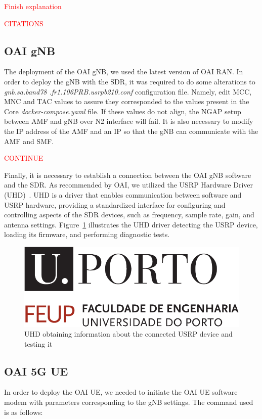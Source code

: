 \textcolor{red}{Finish explanation}

\textcolor{red}{CITATIONS}
\subsection{OAI gNB}\label{subsec:oai-gnb}
The deployment of the OAI gNB, we used the latest version of OAI RAN. In order to deploy the gNB with the SDR, it was required to do some alterations to \textit{gnb.sa.band78
.fr1.106PRB.usrpb210.conf} configuration file.
Namely, edit MCC, MNC and TAC values to assure they corresponded to the values present in the Core \textit{docker-compose.yaml} file.
If these values do not align, the NGAP setup between AMF and gNB over N2 interface will fail.
It is also necessary to modify the IP address of the AMF and an IP so that the gNB can communicate with the AMF and SMF\@.

\textcolor{red}{CONTINUE}

Finally, it is necessary to establish a connection between the OAI gNB software and the SDR\@.
As recommended by OAI, we utilized the USRP Hardware Driver (UHD)~\cite{}.
UHD is a driver that enables communication between software and USRP hardware, providing a standardized interface for configuring and controlling aspects of the SDR devices, such as frequency, sample rate, gain, and antenna settings.
Figure~\ref{fig:uhd_probe} illustrates the UHD driver detecting the USRP device, loading its firmware, and performing diagnostic tests.

\begin{figure}[H]
    \centering
    \includegraphics[width=0.7\linewidth]{figures/uporto-feup}
    \caption{UHD obtaining information about the connected USRP device and testing it}
    \label{fig:uhd_probe}
\end{figure}

\subsection{OAI 5G UE}\label{subsec:oai-5g-ue}
In order to deploy the OAI UE, we needed to initiate the OAI UE software modem with parameters corresponding to the gNB settings.
The command used is as follows:

